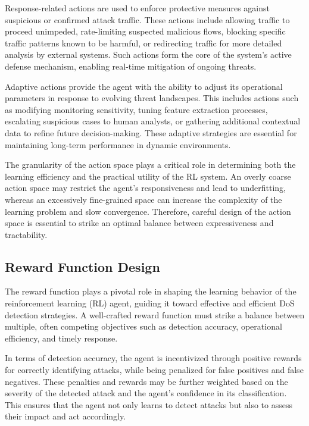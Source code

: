 \documentclass{report}
\begin{document}
Response-related actions are used to enforce protective measures against suspicious or confirmed attack traffic. These actions include allowing traffic to proceed unimpeded, rate-limiting suspected malicious flows, blocking specific traffic patterns known to be harmful, or redirecting traffic for more detailed analysis by external systems. Such actions form the core of the system's active defense mechanism, enabling real-time mitigation of ongoing threats.

Adaptive actions provide the agent with the ability to adjust its operational parameters in response to evolving threat landscapes. This includes actions such as modifying monitoring sensitivity, tuning feature extraction processes, escalating suspicious cases to human analysts, or gathering additional contextual data to refine future decision-making. These adaptive strategies are essential for maintaining long-term performance in dynamic environments.

The granularity of the action space plays a critical role in determining both the learning efficiency and the practical utility of the RL system. An overly coarse action space may restrict the agent's responsiveness and lead to underfitting, whereas an excessively fine-grained space can increase the complexity of the learning problem and slow convergence. Therefore, careful design of the action space is essential to strike an optimal balance between expressiveness and tractability.


\subsection{Reward Function Design}

The reward function plays a pivotal role in shaping the learning behavior of the reinforcement learning (RL) agent, guiding it toward effective and efficient DoS detection strategies. A well-crafted reward function must strike a balance between multiple, often competing objectives such as detection accuracy, operational efficiency, and timely response.

In terms of detection accuracy, the agent is incentivized through positive rewards for correctly identifying attacks, while being penalized for false positives and false negatives. These penalties and rewards may be further weighted based on the severity of the detected attack and the agent’s confidence in its classification. This ensures that the agent not only learns to detect attacks but also to assess their impact and act accordingly.
\end{document}
